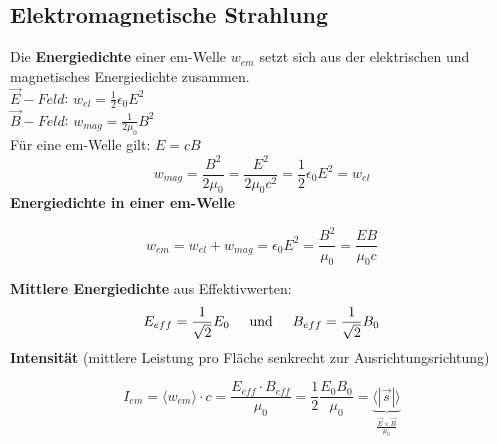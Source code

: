 \begin{flushleft}
\subsection{Elektromagnetische Strahlung}
Die \textbf{Energiedichte} einer em-Welle $w_{em}$ setzt sich aus der elektrischen und magnetisches Energiedichte zusammen.\\[1ex]

\hspace{10mm} $\vec{E}-Feld$: $w_{el} = \frac{1}{2}\epsilon_0 E^2$ \\
\hspace{10mm} $\vec{B}-Feld$: $w_{mag} = \frac{1}{2\mu_0} B^2$ \\[1ex]

Für eine em-Welle gilt: $E = cB$
\[
    w_{mag} = \frac{B^2}{2 \mu_0} = \frac{E^2}{2 \mu_0 c^2} = \frac{1}{2}\epsilon_0 E^2 = w_{el}
\]
\textbf{Energiedichte in einer em-Welle}
\begin{formulabox}
    \[
        w_{em} = w_{el} + w_{mag} = \epsilon_0 E^2 = \frac{B^2}{\mu_0} = \frac{EB}{\mu_0 c}
    \]
\end{formulabox}

\textbf{Mittlere Energiedichte} aus Effektivwerten: \\
\[
    E_{eff} = \frac{1}{\sqrt{2}}E_0 \hspace{5mm} \text{und} \hspace{5mm} B_{eff} = \frac{1}{\sqrt{2}}B_0
\]
\textbf{Intensität} (mittlere Leistung pro Fläche senkrecht zur Ausrichtungsrichtung)
\begin{formulabox}
    \[
        I_{em} = \langle w_{em} \rangle \cdot c = \frac{E_{eff} \cdot B_{eff}}{\mu_0} = \frac{1}{2}\frac{E_0 B_0}{\mu_0} = \underbrace{\langle |\vec{s}| \rangle}_{\frac{\vec{E} \times \vec{B}}{\mu_0}}
    \]
\end{formulabox}


    
\end{flushleft}